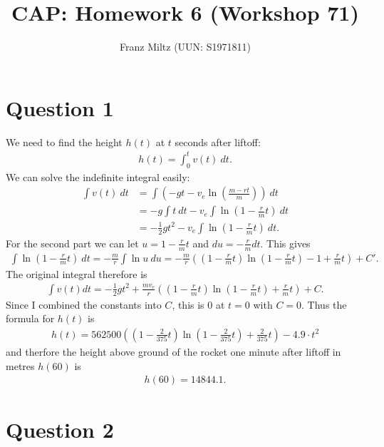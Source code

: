 \documentclass{article}
\title{CAP: Homework 6 (Workshop 71)}
\author{Franz Miltz (UUN: S1971811)}
\begin{document}
\maketitle
\section*{Question 1}
We need to find the height $h(t)$ at $t$ seconds after liftoff:
\begin{align*}
  h(t) = \int_0^t v(t)\: dt.
\end{align*}
We can solve the indefinite integral easily:
\begin{align*}
  \int v(t)\:dt & = \int \left(-gt -v_e \ln \left(\frac{m-rt}{m}\right)\right)\:dt \\
                & = -g \int t\: dt -v_e \int \ln\left(1-\frac{r}{m}t\right)\: dt   \\
                & =-\frac{1}{2}gt^2-v_e \int \ln\left(1-\frac{r}{m}t\right)\:dt.
\end{align*}
For the second part we can let $u=1-\frac{r}{m}t$  and  $du = -\frac{r}{m}dt$. This gives
\begin{align*}
  \int\ln\left(1-\frac{r}{m}t\right)\: dt = -\frac{m}{r}\int \ln u\: du = -\frac{m}{r}\left(\left(1-\frac{r}{m}t\right)\ln\left(1-\frac{r}{m}t\right)-1+\frac{r}{m}t\right)+C'.
\end{align*}
The original integral therefore is
\begin{align*}
  \int v(t)dt =-\frac{1}{2}gt^2+\frac{mv_e}{r}\left(\left(1-\frac{r}{m}t\right)\ln\left(1-\frac{r}{m}t\right)+\frac{r}{m}t\right)+C.
\end{align*}
Since I combined the constants into $C$, this is $0$ at $t=0$ with $C=0$. Thus the formula for $h(t)$ is
\begin{align*}
  h(t)=562500\left(\left(1-\frac{2}{375}t\right)\ln\left(1-\frac{2}{375}t\right)+\frac{2}{375}t\right) -4.9\cdot t^2
\end{align*}
and therfore the height above ground of the rocket one minute after liftoff in metres $h(60)$ is
\begin{align*}
  h(60)=14844.1.
\end{align*}
\section*{Question 2}
\end{document}
